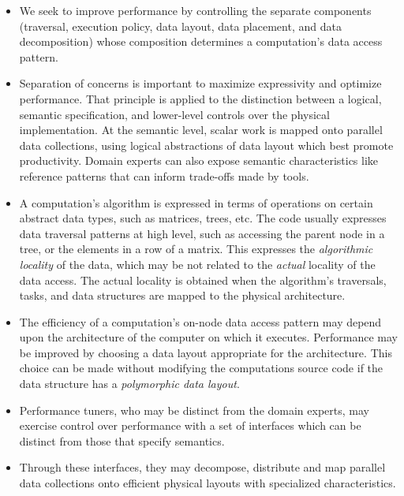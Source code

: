 \begin{itemize}
\item We seek to improve performance by controlling the separate components (traversal, execution policy, data layout, data placement, and data decomposition) whose composition determines a computation's data access pattern. 
%
\item Separation of concerns is important to maximize expressivity and optimize performance. That principle is applied to the distinction between a logical, semantic specification, and lower-level controls over the physical implementation.
 At the semantic level, scalar work is mapped onto parallel data collections, using logical abstractions of data layout which best promote productivity. Domain experts can also expose semantic characteristics like reference patterns that can inform trade-offs made by tools.
%
\item A computation's algorithm is expressed in terms of operations on certain abstract data types, such as matrices, trees, etc. The code usually expresses data traversal patterns at high level, such as accessing the parent node in a tree, or the elements in a row of a matrix. This expresses the {\em algorithmic locality} of the data, which may be not related to the {\em actual} locality of the data access.  The actual locality is obtained when the algorithm's traversals, tasks, and data structures are mapped to the physical architecture. \
%
\item The efficiency of a computation's on-node data access pattern may depend upon the architecture of the computer on which it executes.  Performance may be improved by choosing a data layout appropriate for the architecture.  This choice can be made without modifying the computations source code if the data structure has a {\em polymorphic data layout}.
%
\item Performance tuners, who may be distinct from the domain experts, may exercise control over performance with a set of interfaces which can be distinct from those that specify semantics. 
%
\item Through these interfaces, they may decompose, distribute and map parallel data collections onto efficient physical layouts with specialized characteristics.
\end{itemize}

